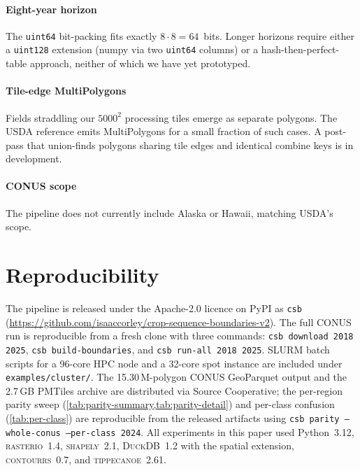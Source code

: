 \documentclass[preprint,12pt]{elsarticle}
\begin{document}
\paragraph{Eight-year horizon} The \texttt{uint64} bit-packing fits
exactly $8 \cdot 8 = 64$~bits. Longer horizons require either a
\texttt{uint128} extension (numpy via two \texttt{uint64} columns) or
a hash-then-perfect-table approach, neither of which we have yet
prototyped.

\paragraph{Tile-edge MultiPolygons} Fields straddling our $5000^2$
processing tiles emerge as separate polygons. The USDA reference
emits MultiPolygons for a small fraction of such cases. A
post-pass that union-finds polygons sharing tile edges and identical
combine keys is in development.

\paragraph{CONUS scope} The pipeline does not currently include
Alaska or Hawaii, matching USDA's scope.

\section{Reproducibility}
\label{sec:reproducibility}

The pipeline is released under the Apache-2.0 licence on PyPI as
\texttt{csb} (\url{https://github.com/isaaccorley/crop-sequence-boundaries-v2}).
The full CONUS run is reproducible from a fresh clone with three
commands: \texttt{csb download 2018 2025}, \texttt{csb build-boundaries},
and \texttt{csb run-all 2018 2025}. SLURM batch scripts for a 96-core
HPC node and a 32-core spot instance are included under
\texttt{examples/cluster/}. The 15.30\,M-polygon CONUS GeoParquet output and
the 2.7\,GB PMTiles archive are distributed via Source Cooperative;
the per-region parity sweep (\cref{tab:parity-summary,tab:parity-detail})
and per-class confusion (\cref{tab:per-class}) are reproducible from
the released artifacts using \texttt{csb parity --whole-conus
--per-class 2024}. All experiments in this paper used Python~3.12,
\textsc{rasterio}~1.4, \textsc{shapely}~2.1, \textsc{DuckDB}~1.2 with
the spatial extension, \textsc{contourrs}~0.7, and \textsc{tippecanoe}~2.61.
\end{document}
